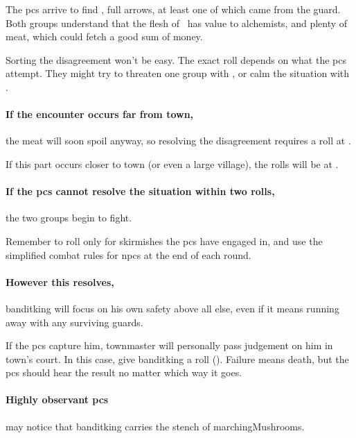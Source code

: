 The \glspl{pc} arrive to find \localMonster, full arrows, at least one of which came from the \gls{guard}.
Both groups understand that the flesh of \localMonster\ has value to alchemists, and plenty of meat, which could fetch a good sum of money.

Sorting the disagreement won't be easy.
The exact roll depends on what the \glspl{pc} attempt.
They might try to threaten one group with , or calm the situation with .


\paragraph{If the encounter occurs far from \gls{town},}
the meat will soon spoil anyway, so resolving the disagreement requires a roll at \tn[9].

If this part occurs closer to \gls{town} (or even a large \gls{village}), the rolls will be at \tn[12].

\paragraph{If the \glspl{pc} cannot resolve the situation within two rolls,}
the two groups begin to fight.

Remember to roll only for skirmishes the \glspl{pc} have engaged in, and use the simplified combat rules for \glspl{npc} at the end of each round.%

\paragraph{However this resolves,}
\gls{banditking} will focus on his own safety above all else, even if it means running away with any surviving guards.

If the \glspl{pc} capture him, \gls{townmaster} will personally pass judgement on him in \gls{town}'s \gls{court}.
In this case, give \gls{banditking} a  roll (\tn[8]).
Failure means death, but the \glspl{pc} should hear the result no matter which way it goes.

\paragraph{Highly observant \glspl{pc}}
may notice that \gls{banditking} carries the stench of \glspl{marchingMushroom}.

